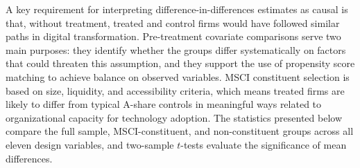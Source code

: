 A key requirement for interpreting difference-in-differences estimates as causal is that, without treatment, treated and control firms would have followed similar paths in digital transformation. Pre-treatment covariate comparisons serve two main purposes: they identify whether the groups differ systematically on factors that could threaten this assumption, and they support the use of propensity score matching to achieve balance on observed variables. MSCI constituent selection is based on size, liquidity, and accessibility criteria, which means treated firms are likely to differ from typical A-share controls in meaningful ways related to organizational capacity for technology adoption. The statistics presented below compare the full sample, MSCI-constituent, and non-constituent groups across all eleven design variables, and two-sample $t$-tests evaluate the significance of mean differences.

